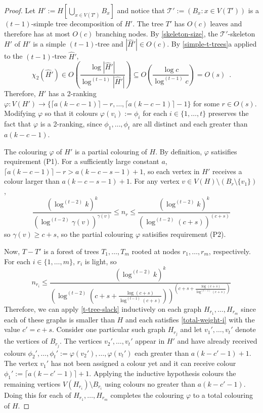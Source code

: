 \documentclass[kpfonts]{patmorin}
\newcommand{\trn}{\chi_2}
\theoremstyle{named}
\newcommand{\weirdref}[2]{\cref{#1}#2}
\begin{document}
\begin{proof}
    Let $H':=H[\bigcup_{x\in V(T')} B_x]$ and notice that $\mathcal{T}':=(B_x:x\in V(T'))$ is a $(t-1)$-simple tree decomposition of $H'$. The tree $T'$ has $O(c)$ leaves and therefore has at most $O(c)$ branching nodes. By \cref{skeleton-size}, the $\mathcal{T}'$-skeleton $\hat{H'}$ of $H'$ is a simple $(t-1)$-tree and $|\hat{H}'|\in O(c)$.  By \weirdref{simple-t-trees}{a} applied to the $(t-1)$-tree $\hat{H}'$,
    \[
       \trn(\hat{H}')\in
       O\left(\frac{\log|\hat{H}'|}{\log^{(t-1)}|\hat{H}'|}\right)
       \subseteq O\left(\frac{\log c}{\log^{(t-1)} c}\right) = O(s) \enspace .
    \]
    Therefore, $H'$ has a 2-ranking $\varphi:V(H')\to \{\lceil a(k-c-1)\rceil-r,\ldots,\lceil a(k-c-1)\rceil-1\}$ for some $r\in O(s)$. Modifying $\varphi$ so that it colours $\varphi(v_i):=\phi_i$ for each $i\in\{1,\ldots,t\}$ preserves the fact that $\varphi$ is a 2-ranking, since $\phi_1,\ldots,\phi_t$ are all distinct and each greater than $a(k-c-1)$.

    The colouring $\varphi$ of $H'$ is a partial colouring of $H$. By definition, $\varphi$ satisifies requirement (P1). For a sufficiently large constant $a$, $\lceil a(k-c-1)\rceil-r >  a(k-c-s-1)+1$, so each vertex in $H'$ receives a colour larger than $a(k-c-s-1)+1$.  For any vertex $v\in V(H)\setminus (B_r\setminus \{v_1\})$,
    \[ \frac{(\log^{(t-2)} k)^k}{(\log^{(t-2)}\gamma(v))^{\gamma(v)}}
         \le n_r
         \le \frac{(\log^{(t-2)} k)^k}{(\log^{(t-2)}(c+s))^{(c+s)}}
    \]
    so $\gamma(v)\ge c+s$, so the partial colouring $\varphi$ satisifies requirement (P2).

   Now, $T-T'$ is a forest of trees $T_1,\ldots,T_m$ rooted at nodes $r_1,\ldots,r_m$, respectively.
   For each $i\in\{1,\ldots,m\}$, $r_i$ is light, so
   \[
       n_{r_i} \le \frac{(\log^{(t-2)} k)^k}{
        \left(
            \log^{(t-2)}
                \left(
                   c+s+\tfrac{\log(c+s)}{\log^{(t-1)}(c+s)}
               \right)
        \right)^{\left(
           c+s+\tfrac{\log(c+s)}{\log^{(t-1)}(c+s)}
       \right)}
       }
   \]
   Therefore, we can apply \cref{t-tree-slack} inductively on each graph $H_{r_1},\ldots,H_{r_m}$ since each of these graphs is smaller than $H$ and each satisfies \cref{total-weight-i} with the value $c'=c+s$.
   Consider one particular such graph $H_{r_j}$ and let $v_1',\ldots,v_t'$ denote the vertices of $B_{r_j}$.  The vertices $v_2',\ldots,v_t'$ appear in $H'$ and have already received colours $\phi_2',\ldots,\phi_t':=\varphi(v_2'),\ldots,\varphi(v_t')$ each greater than $a(k-c'-1)+1$.  The vertex $v_1'$ has not been assigned a colour yet and it can receive colour $\phi_1':=\lceil a(k-c'-1)\rceil+1$.  Applying the inductive hypothesis colours the remaining vertices $V(H_{r_i})\setminus B_{r_i}$ using colours no greater than $a(k-c'-1)$.  Doing this for each of $H_{r_1},\ldots,H_{r_m}$ completes the colouring $\varphi$ to a total colouring of $H$.


\end{proof}
\end{document}
